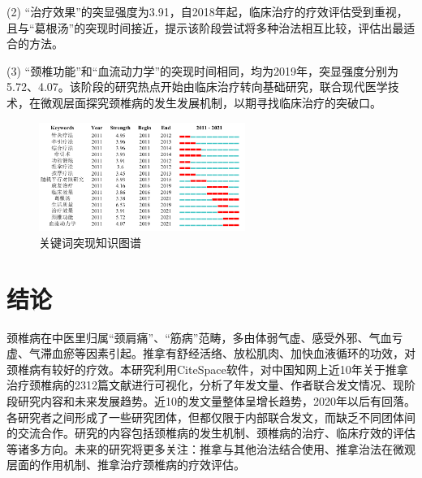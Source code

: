 \documentclass[lang=cn,11pt,a4paper,cite=super,AutoFakeBold,chinesefont=founder]{elegantpaper}
\begin{document}
(2) “治疗效果”的突显强度为3.91，自2018年起，临床治疗的疗效评估受到重视，且与“葛根汤”的突现时间接近，提示该阶段尝试将多种治法相互比较，评估出最适合的方法。

(3) “颈椎功能”和“血流动力学”的突现时间相同，均为2019年，突显强度分别为5.72、4.07。该阶段的研究热点开始由临床治疗转向基础研究，联合现代医学技术，在微观层面探究颈椎病的发生发展机制，以期寻找临床治疗的突破口。

\begin{figure}[!ht]
  \centering
  \includegraphics[width=0.6\textwidth]{figure/关键词突现.png}
  \caption{关键词突现知识图谱}
  \label{figure:5}
\end{figure}

\section{结论}

颈椎病在中医里归属“颈肩痛”、“筋病”范畴，多由体弱气虚、感受外邪、气血亏虚、气滞血瘀等因素引起。推拿有舒经活络、放松肌肉、加快血液循环的功效，对颈椎病有较好的疗效。本研究利用CiteSpace软件，对中国知网上近10年关于推拿治疗颈椎病的2312篇文献进行可视化，分析了年发文量、作者联合发文情况、现阶段研究内容和未来发展趋势。近10的发文量整体呈增长趋势，2020年以后有回落。各研究者之间形成了一些研究团体，但都仅限于内部联合发文，而缺乏不同团体间的交流合作。研究的内容包括颈椎病的发生机制、颈椎病的治疗、临床疗效的评估等诸多方向。未来的研究将更多关注：推拿与其他治法结合使用、推拿治法在微观层面的作用机制、推拿治疗颈椎病的疗效评估。

\nocite{*}



















\end{document}
